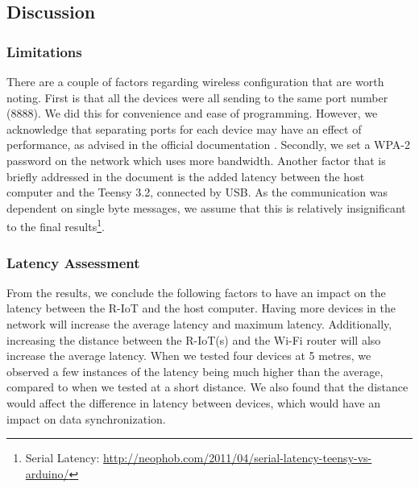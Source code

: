 \subsection{Discussion}

\subsubsection{Limitations}
There are a couple of factors regarding wireless configuration that are worth noting. First is that all the devices were all sending to the same port number (8888). We did this for convenience and ease of programming. However, we acknowledge that separating ports for each device may have an effect of performance, as advised in the official documentation \cite{noauthor_bitalino_nodate}. Secondly, we set a WPA-2 password on the network which uses more bandwidth. Another factor that is briefly addressed in the document is the added latency between the host computer and the Teensy 3.2, connected by USB. As the communication was dependent on single byte messages, we assume that this is relatively insignificant to the final results\footnote{Serial Latency: \url{http://neophob.com/2011/04/serial-latency-teensy-vs-arduino/}}.

\subsubsection{Latency Assessment}

From the results, we conclude the following factors to have an impact on the latency between the R-IoT and the host computer. Having more devices in the network will increase the average latency and maximum latency. Additionally, increasing the distance between the R-IoT(s) and the Wi-Fi router will also increase the average latency. When we tested four devices at 5 metres, we observed a few instances of the latency being much higher than the average, compared to when we tested at a short distance. We also found that the distance would affect the difference in latency between devices, which would have an impact on data synchronization.
